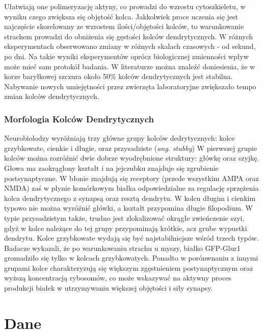 \documentclass{article}
\begin{document}
Ułatwiają one polimeryzację aktyny, co prowadzi do wzrostu cytoszkieletu, w wyniku czego zwiększa się objętość kolca\cite{Costa2007}.
Jakkolwiek proce uczenia się jest najczęście skorelowany ze wzrostem ilości/objętości kolców, to warunkowanie strachem prowadzi do obniżenia się gęstości kolców dendrytycznych.
W różnych eksperymentach obserwowano zmiany w różnych skalach czasowych - od sekund, po dni.
Na takie wyniki eksperymentów oprócz biologicznej zmienności wpływ może mieć sam protokół badania.
W literaturze\citep{Sala2014} można znaleźć doniesienia, że w korze baryłkowej szczura około 50\% kolców dendrytycznych jest stabilna.
Nabywanie nowych umiejętności przez zwierzęta laboratoryjne zwiększało tempo zmian kolców dendrytycznych.


\subsubsection{Morfologia Kolców Dendrytycznych}
Neurobiolodzy wyróźniają trzy główne grupy kolców dedrytycznych: kolce grzybkowate, cienkie i długie, oraz przysadziste (\emph{ang. stubby})
W pierwszej grupie kolców można rozróźnić dwie dobrze wyodrębnione struktury: główkę oraz szyjkę.
Głowa ma zaokrąglony kształt i na jejczubku znajduje się zgrubienie postsynaptyczne.
W błonie znajdują się receptory (przede wszystkim AMPA oraz NMDA) zaś w płynie komórkowym białka odpowiedzialne za regulację sprzężenia kolca dendrytycznego z synapsą oraz resztą dendrytu. %
W kolcu długim i cienkim typowo nie można wyróźnić główki, a kształt przypomina długie filopodium.
W typie przysadzistym także, trudno jest zlokalizować okrągłe zwieńczenie szyi, gdyż w kolce należące do tej grupy przypominają krótkie, acz grube wypustki dendrytu. %
Kolce grzybkowate wydają się być najstabilniejsze wśród trzech typów.
Badacze wykazali, że po warunkowaniu strachu u myszy, białko GFP-Glur1 gromadziło się tylko w kolcach grzybkowatych.
Ponadto w porónwnaniu z innymi grupami kolce charakteryzują się większym zgęstnieniem postynaptycznym oraz wyższą koncentracją rybosomów, co może wskazywać na aktywny proces produkcji białek w utrzymywaniu większej objętości i siły synapsy.
\cite{Sala2014}
\cite{Costa2007}

\section{Dane}
\end{document}
